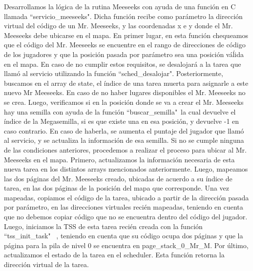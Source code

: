 \documentclass[a4paper]{article}
\begin{document}
Desarrollamos la lógica de la rutina Meeseeks con ayuda de una función en C llamada ``servicio_meeseeks". Dicha función recibe como parámetro la dirección virtual del código de un Mr. Meeseeks, y las coordenadas x e y donde el Mr. Meeseeks debe ubicarse en el mapa. En primer lugar, en esta función chequeamos que el código del Mr. Meeseeks se encuentre en el rango de direcciones de código de los jugadores y que la posición pasada por parámetro sea una posición váĺida en el mapa. En caso de no cumplir estos requisitos, se desalojará a la tarea que llamó al servicio utilizando la función ``sched_desalojar". Posteriormente, buscamos en el array de state, el índice de una tarea muerta para asignarle a este nuevo Mr Meeseeks. En caso de no haber lugares disponibles el Mr. Meeseeks no se crea. Luego, verificamos si en la posición donde se va a crear el Mr. Meeseeks hay una semilla con ayuda de la función ``buscar_semilla"\, la cual devuelve el índice de la Megasemilla, si es que existe una en esa posición, y devuelve -1 en caso contrario. En caso de haberla, se aumenta el puntaje del jugador que llamó al servicio, y se actualiza la información de esa semilla. Si no se cumple ninguna de las condiciones anteriores, procedemos a realizar el proceso para ubicar al Mr. Meeseeks en el mapa. Primero, actualizamos la información necesaria de esta nueva tarea en los distintos arrays mencionados anteriormente. Luego, mapeamos las dos páginas del Mr. Meeseeks creado, ubicadas de acuerdo a su índice de tarea, en las dos páginas de la posición del mapa que corresponde. Una vez mapeadas, copiamos el código de la tarea, ubicado a partir de la dirección pasada por parámetro, en las direcciones virtuales recién mapeadas, teniendo en cuenta que no debemos copiar código que no se encuentra dentro del código del jugador. Luego, iniciamos la TSS de esta tarea recién creada con la función ``tss_init_task" \ , teniendo en cuenta que su código ocupa dos páginas y que la página para la pila de nivel 0 se encuentra en page_stack_0_Mr_M. Por último, actualizamos el estado de la tarea en el scheduler. Esta función retorna la dirección virtual de la tarea.
\end{document}
